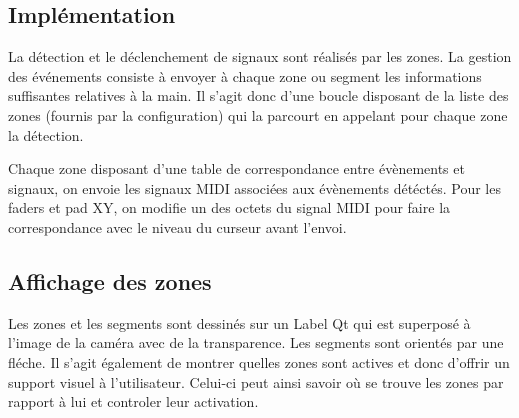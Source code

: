\subsection{Implémentation}
\par  La détection et le déclenchement de signaux sont réalisés par les  zones. La gestion des événements consiste à envoyer à chaque  zone ou segment les informations suffisantes relatives à la main. Il s'agit  donc d'une boucle disposant de la liste des zones (fournis par la  configuration) qui la parcourt en appelant pour chaque zone la  détection.
\par Chaque zone disposant d'une table de correspondance entre évènements et signaux, on envoie les signaux MIDI associées aux évènements détéctés. Pour les faders et pad XY, on modifie un des octets du signal MIDI pour faire la correspondance avec le niveau du curseur avant l'envoi.
\subsection{Affichage des zones}
\par  Les zones et les segments sont dessinés sur un Label Qt qui est superposé à l'image de la caméra avec de la transparence. Les segments sont orientés par une fléche. Il s'agit également de montrer quelles zones sont actives et donc d'offrir un support visuel à l'utilisateur. Celui-ci peut ainsi savoir où se trouve les zones par rapport à lui et controler leur activation.
